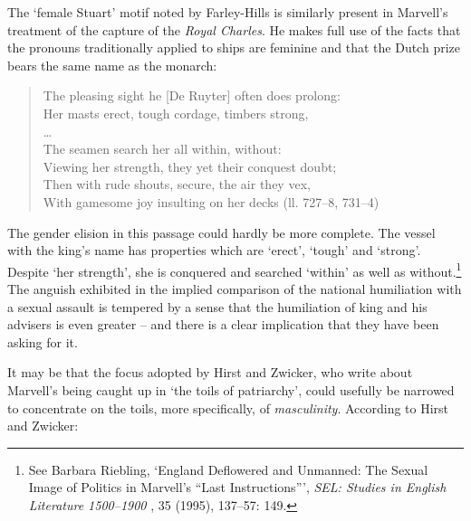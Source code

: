 ﻿\documentclass[12pt]{article}
\newcommand{\citedtitle}[1]{\textit{#1}}
\begin{document}
The
‘female Stuart’ motif noted by Farley-Hills is similarly present in Marvell’s
treatment of the capture of the \textit{Royal Charles}. He makes full use of
the facts that the pronouns traditionally applied to ships are feminine and
that the Dutch prize bears the same name as the monarch:

\begin{verse}
The pleasing sight he [De Ruyter] often does prolong:\\
Her masts erect, tough cordage, timbers strong,\\
…\\
The seamen search her all within, without:\\
Viewing her strength, they yet their conquest doubt;\\
Then with rude shouts, secure, the air they vex,\\
With gamesome joy insulting on her decks (ll. 727–8, 731–4)
\end{verse}
The gender elision in this passage could hardly be more complete. The vessel with
the king’s name has properties which are ‘erect’, ‘tough’ and ‘strong’. Despite
‘her strength’, she is conquered and searched ‘within’ as well as without.\footnote{See Barbara Riebling,
‘England Deflowered and Unmanned: The Sexual Image of Politics in Marvell’s
“Last Instructions”’, \citedtitle{SEL: Studies in English Literature
1500–1900 }, 35 (1995), 137–57: 149.} The
anguish exhibited in the implied comparison of the national humiliation with a
sexual assault is tempered by a sense that the humiliation of king and his
advisers is even greater – and there is a clear implication that they have been
asking for it.

It
may be that the focus adopted by Hirst and Zwicker, who write about Marvell’s
being caught up in ‘the toils of patriarchy’, could usefully be narrowed to
concentrate on the toils, more specifically, of \emph{masculinity}. According to Hirst and
Zwicker:
\end{document}
